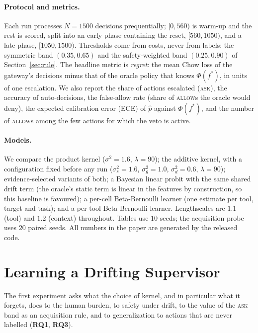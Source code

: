 \documentclass[11pt]{article}
\newcommand{\RQ}[1]{\textbf{RQ#1}}
\begin{document}
\paragraph{Protocol and metrics.} Each run processes $N = 1500$ decisions
prequentially; $[0, 560)$ is warm-up and the rest is scored, split into an
early phase containing the reset, $[560, 1050)$, and a late phase,
$[1050, 1500)$. Thresholds come from costs, never from labels: the symmetric
band $(0.35, 0.65)$ and the safety-weighted band $(0.25, 0.90)$ of
Section~\ref{sec:rule}. The headline metric is \emph{regret}: the mean Chow
loss of the gateway's decisions minus that of the oracle policy that knows
$\Phi(f^*)$, in units of one escalation. We also report the share of actions
escalated (\textsc{ask}), the accuracy of auto-decisions, the false-allow
rate (share of \textsc{allow}s the oracle would deny), the expected
calibration error (ECE) of $\hat p$ against $\Phi(f^*)$, and the number of
\textsc{allow}s among the few actions for which the veto is active.

\paragraph{Models.} We compare the product kernel ($\sigma^2 = 1.6$,
$\lambda = 90$); the additive kernel, with a configuration fixed before any
run ($\sigma_s^2 = 1.6$, $\sigma_g^2 = 1.0$, $\sigma_d^2 = 0.6$,
$\lambda = 90$); evidence-selected variants of both; a Bayesian linear probit
with the same shared drift term (the oracle's static term is linear in the
features by construction, so this baseline is favoured); a per-cell
Beta-Bernoulli learner (one estimate per tool, target and task); and a
per-tool Beta-Bernoulli learner. Lengthscales are $1.1$ (tool) and $1.2$
(context) throughout. Tables use $10$ seeds; the acquisition probe uses $20$
paired seeds. All numbers in the paper are generated by the released code.

\section{Learning a Drifting Supervisor}\label{sec:exp-drift}

The first experiment asks what the choice of kernel, and in particular what
it forgets, does to the human burden, to safety under drift, to the value of
the \textsc{ask} band as an acquisition rule, and to generalization to actions
that are never labelled (\RQ1, \RQ3).
\end{document}
